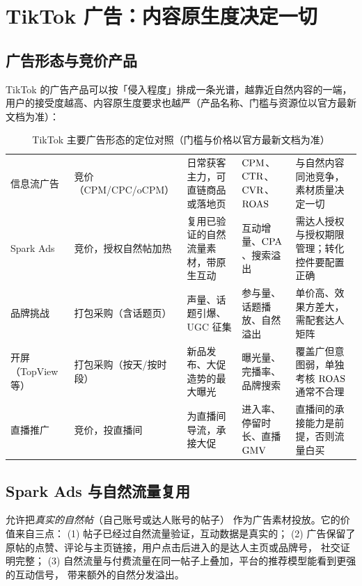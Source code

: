 \section{TikTok 广告：内容原生度决定一切}
\label{sec:tiktok}

\subsection{广告形态与竞价产品}

TikTok 的广告产品可以按「侵入程度」排成一条光谱，越靠近自然内容的一端，
用户的接受度越高、内容原生度要求也越严（产品名称、门槛与资源位以官方最新文档为准）：

\begin{table}[htbp]
\centering
\caption{TikTok 主要广告形态的定位对照（门槛与价格以官方最新文档为准）}
\label{tab:tiktokformats}
\small
\begin{tabularx}{\textwidth}{L{2.3cm} L{2.5cm} L{2.9cm} L{2.4cm} Y}
\toprule
{} &  &  &  &  \\
\midrule
信息流广告 & 竞价（CPM/CPC/oCPM） & 日常获客主力，可直链商品或落地页 & $\operatorname{CPM}$、$\operatorname{CTR}$、$\operatorname{CVR}$、$\operatorname{ROAS}$ & 与自然内容同池竞争，素材质量决定一切 \\
Spark Ads & 竞价，授权自然帖加热 & 复用已验证的自然流量素材，带原生互动 & 互动增量、$\operatorname{CPA}$、搜索溢出 & 需达人授权与授权期限管理；转化控件要配置正确 \\
品牌挑战 & 打包采购（含话题页） & 声量、话题引爆、UGC 征集 & 参与量、话题播放、自然溢出 & 单价高、效果方差大，需配套达人矩阵 \\
开屏（TopView 等） & 打包采购（按天/按时段） & 新品发布、大促造势的最大曝光 & 曝光量、完播率、品牌搜索 & 覆盖广但意图弱，单独考核 $\operatorname{ROAS}$ 通常不合理 \\
直播推广 & 竞价，投直播间 & 为直播间导流，承接大促 & 进入率、停留时长、直播 $\operatorname{GMV}$ & 直播间的承接能力是前提，否则流量白买 \\
\bottomrule
\end{tabularx}
\end{table}

\subsection{Spark Ads 与自然流量复用}

允许把\emph{真实的自然帖}（自己账号或达人账号的帖子）
作为广告素材投放。它的价值来自三点：
(1) 帖子已经过自然流量验证，互动数据是真实的；
(2) 广告保留了原帖的点赞、评论与主页链接，用户点击后进入的是达人主页或品牌号，
社交证明完整；
(3) 自然流量与付费流量在同一帖子上叠加，平台的推荐模型能看到更强的互动信号，
带来额外的自然分发溢出。

